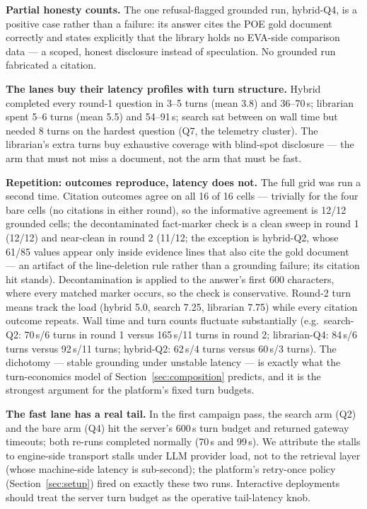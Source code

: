 \documentclass[preprint,12pt]{elsarticle}
\begin{document}
\textbf{Partial honesty counts.} The one refusal-flagged grounded run,
hybrid-Q4, is a positive case rather than a failure: its answer cites the
POE gold document correctly and states explicitly that the library holds no
EVA-side comparison data --- a scoped, honest disclosure instead of
speculation. No grounded run fabricated a citation.

\textbf{The lanes buy their latency profiles with turn structure.} Hybrid
completed every round-1 question in 3--5 turns (mean 3.8) and 36--70\,s;
librarian
spent 5--6 turns (mean 5.5) and 54--91\,s; search sat between on wall time
but needed 8 turns on the hardest question (Q7, the telemetry cluster).
The librarian's extra turns buy exhaustive coverage with blind-spot
disclosure --- the arm that must not miss a document, not the arm that
must be fast.

\textbf{Repetition: outcomes reproduce, latency does not.} The full grid
was run a second time. Citation outcomes agree on all 16 of 16 cells ---
trivially for the four bare cells (no citations in either round), so the
informative agreement is 12/12 grounded cells; the decontaminated
fact-marker check is a clean sweep in round 1 (12/12) and near-clean in
round 2 (11/12; the exception is hybrid-Q2, whose 61/85 values appear only
inside evidence lines that also cite the gold document --- an artifact of
the line-deletion rule rather than a grounding failure; its citation hit
stands). Decontamination is applied to the answer's first 600 characters,
where every matched marker occurs, so the check is conservative. Round-2
turn means track the load (hybrid 5.0, search 7.25, librarian 7.75) while
every citation outcome repeats.
Wall time and turn counts fluctuate substantially
(e.g.\ search-Q2: 70\,s/6 turns in round 1 versus 165\,s/11 turns in
round 2; librarian-Q4: 84\,s/6 turns versus 92\,s/11 turns; hybrid-Q2:
62\,s/4 turns versus 60\,s/3 turns). The dichotomy --- stable grounding
under unstable latency --- is exactly what the turn-economics model of
Section~\ref{sec:composition} predicts, and it is the strongest argument
for the platform's fixed turn budgets.

\textbf{The fast lane has a real tail.} In the first campaign pass, the
search arm (Q2) and the bare arm (Q4) hit the server's 600\,s turn budget
and returned gateway timeouts; both re-runs completed normally (70\,s and
99\,s). We attribute the stalls to engine-side transport stalls under LLM
provider load, not to the retrieval layer (whose machine-side latency is
sub-second); the platform's retry-once policy (Section~\ref{sec:setup})
fired on exactly these two runs. Interactive deployments should treat the
server turn budget as the operative tail-latency knob.
\end{document}
